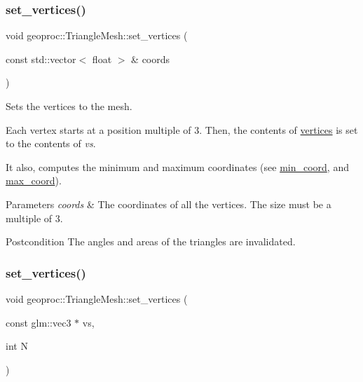 \subsubsection{\texorpdfstring{set\+\_\+vertices()}{set\_vertices()}\hspace{0.1cm}{\footnotesize\ttfamily [1/3]}}
{\footnotesize\ttfamily void geoproc\+::\+Triangle\+Mesh\+::set\+\_\+vertices (\begin{DoxyParamCaption}\item[{const std\+::vector$<$ float $>$ \&}]{coords }\end{DoxyParamCaption})}



Sets the vertices to the mesh. 

Each vertex starts at a position multiple of 3. Then, the contents of \hyperlink{classgeoproc_1_1TriangleMesh_a82c3351de37daa9440f53597f080992d}{vertices} is set to the contents of {\itshape vs}.

It also, computes the minimum and maximum coordinates (see \hyperlink{classgeoproc_1_1TriangleMesh_aab5e7d8baf6f6cd7b5655b4c89f79e00}{min\+\_\+coord}, and \hyperlink{classgeoproc_1_1TriangleMesh_acffb17b164f0428aa01316b0a08bc2a3}{max\+\_\+coord}). 
\begin{DoxyParams}{Parameters}
{\em coords} & The coordinates of all the vertices. The size must be a multiple of 3.\\
\hline
\end{DoxyParams}
\begin{DoxyPostcond}{Postcondition}
The angles and areas of the triangles are invalidated. 
\end{DoxyPostcond}
\mbox{\label{classgeoproc_1_1TriangleMesh_a09b76789e908062501de253d360e0236}} 
\subsubsection{\texorpdfstring{set\+\_\+vertices()}{set\_vertices()}\hspace{0.1cm}{\footnotesize\ttfamily [2/3]}}
{\footnotesize\ttfamily void geoproc\+::\+Triangle\+Mesh\+::set\+\_\+vertices (\begin{DoxyParamCaption}\item[{const glm\+::vec3 $\ast$}]{vs,  }\item[{int}]{N }\end{DoxyParamCaption})}



